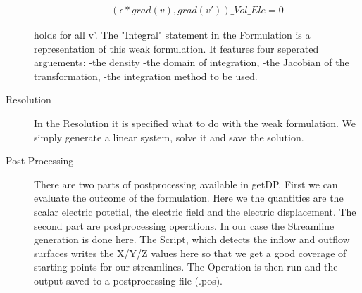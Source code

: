 \documentclass[preprint,journal]{vgtc}       %
\begin{document}
\begin{description}
	\begin{align*} %
	({\epsilon * grad {(v)}, grad {(v')}}) \_Vol\_Ele =  0
	\end{align*}
	
	holds for all v'.
	The "Integral" statement in the Formulation is a representation of this weak formulation. It features four seperated arguements:
	-the density\newline
	-the domain of integration, \newline
	-the Jacobian of the transformation, \newline
	-the integration method to be used.\newline
	\item[Resolution]
	In the Resolution it is specified what to do with the weak formulation. We simply generate a linear system, solve it and save the solution.  %
	\item[Post Processing]
	There are two parts of postprocessing available in getDP. First we can evaluate the outcome of the formulation. Here we the quantities are the scalar electric potetial, the electric field and the electric displacement.
	The second part are postprocessing operations. In our case the Streamline generation is done here. The Script, which detects the inflow and outflow surfaces writes the X/Y/Z values here so that we get a good coverage of starting points for our streamlines. The Operation is then run and the output saved to a postprocessing file (.pos).
	\end{description}
\end{document}
